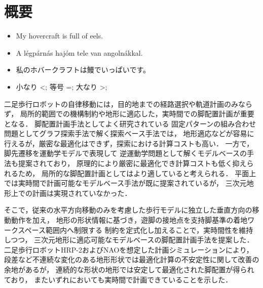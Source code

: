 \documentclass[autodetect-engine,dvipdfmx-if-dvi,ja=standard,a4j,jbase=11pt,magstyle=nomag*]{bxjsreport}
\begin{document}
\chapter*{概要}

\begin{itemize}
    \item My hovercraft is full of eels.
    \item A légpárnás hajóm tele van angolnákkal.
    \item 私のホバークラフトは鰻でいっぱいです。
    \item 小なり <; 等号 =; 大なり >;
\end{itemize}

二足歩行ロボットの自律移動には，目的地までの経路選択や軌道計画のみならず，
局所的範囲での機構制約や地形に適応した，実時間での脚配置計画が重要となる．
脚配置計画手法としてよく研究されている
固定パターンの組み合わせ問題としてグラフ探索手法で解く探索ベース手法では，
地形適応などが容易に行えるが，厳密な最適化はできず，探索における計算コストも高い．
一方で，脚先遷移を運動学モデルで表現して
逆運動学問題として解くモデルベースの手法も提案されており，
原理的により厳密に最適化でき計算コストも低く抑えられるため，
局所的な脚配置計画としてはより適していると考えられる．
平面上では実時間で計画可能なモデルベース手法が既に提案されているが，
三次元地形上での計画は実現されていなかった．

そこで，従来の水平方向移動のみを考慮した歩行モデルに独立した垂直方向の移動動作を加え，
地形の形状情報に基づき，遊脚の接地点を支持脚基準の着地ワークスペース範囲内へ制限する
制約を定式化し加えることで，実時間性を維持しつつ，
三次元地形に適応可能なモデルベースの脚配置計画手法を提案した．
二足歩行ロボットHRP-2およびNAOを想定した計画シミュレーションにより，
段差など不連続な変化のある地形形状では最適化計算の不安定性に関して改善の余地があるが，
連続的な形状の地形では安定して最適化された脚配置が得られており，
またいずれにおいても実時間で計画できていることを示した．
\end{document}
